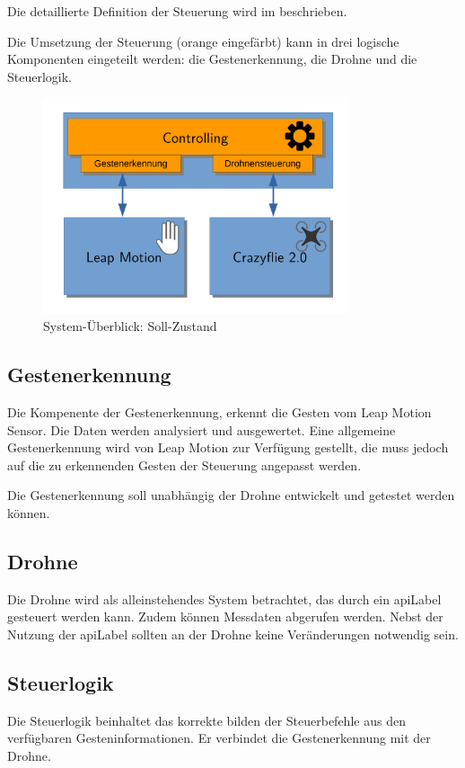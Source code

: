 Die detaillierte Definition der Steuerung wird im  beschrieben.

Die Umsetzung der Steuerung (orange eingefärbt) kann in drei logische Komponenten eingeteilt werden: die Gestenerkennung, die Drohne und die Steuerlogik.

\begin{figure}[H]
	\centering
	\includegraphics[width=0.8\textwidth]{figures/system_full.pdf}
	\caption{System-Überblick: Soll-Zustand}
\end{figure}

\subsection{Gestenerkennung}
Die Kompenente der Gestenerkennung, erkennt die Gesten vom Leap Motion Sensor. Die Daten werden analysiert und ausgewertet.
Eine allgemeine Gestenerkennung wird von Leap Motion zur Verfügung gestellt, die muss jedoch auf die zu erkennenden Gesten der Steuerung angepasst werden.

Die Gestenerkennung soll unabhängig der Drohne entwickelt und getestet werden können.

\subsection{Drohne}
Die Drohne wird als alleinstehendes System betrachtet, das durch ein \gls{apiLabel} gesteuert werden kann. Zudem können Messdaten abgerufen werden. Nebst der Nutzung der \gls{apiLabel} sollten an der Drohne keine Veränderungen notwendig sein.

\subsection{Steuerlogik}
Die Steuerlogik beinhaltet das korrekte bilden der Steuerbefehle aus den verfügbaren Gesteninformationen.
Er verbindet die Gestenerkennung mit der Drohne.

